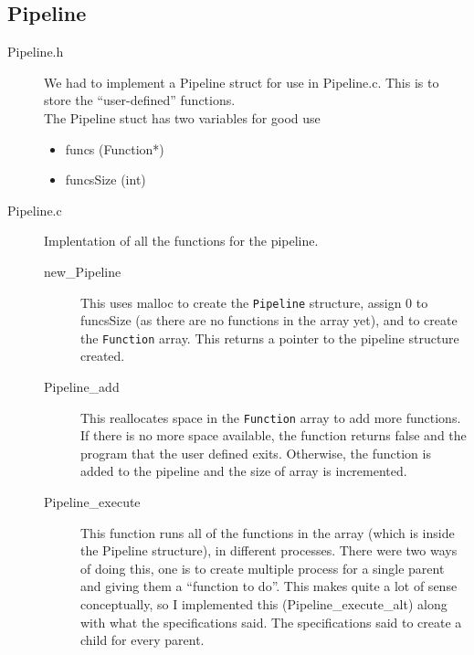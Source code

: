 \documentclass[11pt]{article}
\begin{document}
\subsection{Pipeline}
\label{sec:orgff6e5da}
\begin{description}
\item[{Pipeline.h}] We had to implement a Pipeline struct for use in Pipeline.c. This is to store the ``user-defined'' functions.\\
The Pipeline stuct has two variables for good use\\
\begin{itemize}
\item funcs (Function*)\\
\item funcsSize (int)\\
\end{itemize}

\item[{Pipeline.c}] Implentation of all the functions for the pipeline.\\
\begin{description}
\item[{new\_Pipeline}] This uses malloc to create the \texttt{Pipeline} structure, assign 0 to funcsSize (as there are no functions in the array yet), and to create the \texttt{Function} array. This returns a pointer to the pipeline structure created.\\
\item[{Pipeline\_add}] This reallocates space in the \texttt{Function} array to add more functions. If there is no more space available, the function returns false and the program that the user defined exits. Otherwise, the function is added to the pipeline and the size of array is incremented.\\
\item[{Pipeline\_execute}] This function runs all of the functions in the array (which is inside the Pipeline structure), in different processes. There were two ways of doing this, one is to create multiple process for a single parent and giving them a ``function to do''. This makes quite a lot of sense conceptually, so I implemented this (Pipeline\_execute\_alt) along with what the specifications said. The specifications said to create a child for every parent.\\


\end{description}
\end{description}
\end{document}
